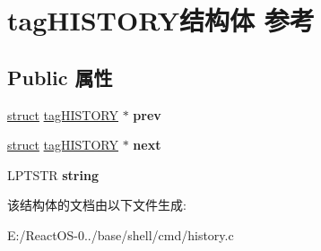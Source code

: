 \hypertarget{structtag_h_i_s_t_o_r_y}{}\section{tag\+H\+I\+S\+T\+O\+R\+Y结构体 参考}
\label{structtag_h_i_s_t_o_r_y}
\subsection*{Public 属性}
\begin{DoxyCompactItemize}
\item 
\mbox{\label{structtag_h_i_s_t_o_r_y_a4adf0eddca610fd6066e5e928d74d7ba}} 
\hyperlink{interfacestruct}{struct} \hyperlink{structtag_h_i_s_t_o_r_y}{tag\+H\+I\+S\+T\+O\+RY} $\ast$ {\bfseries prev}
\item 
\mbox{\label{structtag_h_i_s_t_o_r_y_a8128bea4836cc8f615dba68a03fca8dc}} 
\hyperlink{interfacestruct}{struct} \hyperlink{structtag_h_i_s_t_o_r_y}{tag\+H\+I\+S\+T\+O\+RY} $\ast$ {\bfseries next}
\item 
\mbox{\label{structtag_h_i_s_t_o_r_y_ab2db357a4307063f9b132bc800d39b3b}} 
L\+P\+T\+S\+TR {\bfseries string}
\end{DoxyCompactItemize}


该结构体的文档由以下文件生成\+:\begin{DoxyCompactItemize}
\item 
E\+:/\+React\+O\+S-\/0../base/shell/cmd/history.\+c\end{DoxyCompactItemize}
